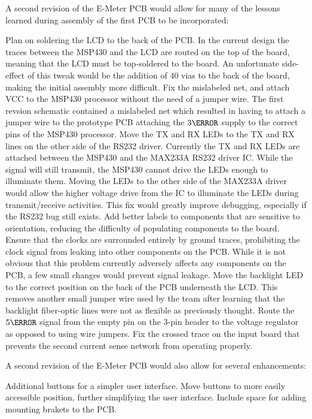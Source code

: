 A second revision of the E-Meter \ac{PCB} would allow for many of the lessons learned during assembly of the first \ac{PCB} to be incorporated:
\begin{outline}[enumerate]
\1 Plan on soldering the \ac{LCD} to the back of the \ac{PCB}.
\2 In the current design the traces between the MSP430 and the \ac{LCD} are routed on the top of the board, meaning that the \ac{LCD} must be top-soldered to the board.
\2 An unfortunate side-effect of this tweak would be the addition of 40 vias to the back of the board, making the initial assembly more difficult.
\1 Fix the mislabeled net, and attach VCC to the MSP430 processor without the need of a jumper wire.
\2 The first revsion schematic contained a mislabeled net which resulted in having to attach a jumper wire to the prototype \ac{PCB} attaching the $3\volt$ supply to the correct pins of the MSP430 processor.
\1 Move the TX and RX \acp{LED} to the TX and RX lines on the other side of the \ac{RS232} driver.
\2 Currently the TX and RX \acp{LED} are attached between the MSP430 and the MAX233A \ac{RS232} driver \ac{IC}. While the signal will still transmit, the MSP430 cannot drive the \acp{LED} enough to illuminate them.
\2 Moving the \acp{LED} to the other side of the MAX233A driver would allow the higher voltage drive from the \ac{IC} to illuminate the \acp{LED} during transmit/receive activities.
\2 This fix would greatly improve debugging, especially if the \ac{RS232} bug still exists.
\1 Add better labels to components that are sensitive to orientation, reducing the difficulty of populating components to the board.
\1 Ensure that the clocks are surrounded entirely by ground traces, prohibiting the clock signal from leaking into other components on the \ac{PCB}.
\2 While it is not obvious that this problem currently adversely affects any components on the \ac{PCB}, a few small changes would prevent signal leakage.
\1 Move the backlight \ac{LED} to the correct position on the back of the \ac{PCB} underneath the \ac{LCD}.
\2 This removes another small jumper wire used by the team after learning that the backlight fiber-optic lines were not as flexible as previously thought.
\1 Route the $5\volt$ signal from the empty pin on the 3-pin header to the voltage regulator as opposed to using wire jumpers.
\1 Fix the crossed trace on the input board that prevents the second current sense network from operating properly.
\end{outline} 
A second revision of the E-Meter \ac{PCB} would also allow for several enhancements:
\begin{outline}[enumerate]
\1 Additional buttons for a simpler user interface.
\1 Move buttons to more easily accessible position, further simplifying the user interface.
\1 Include space for adding mounting brakets to the \ac{PCB}.
\end{outline}
